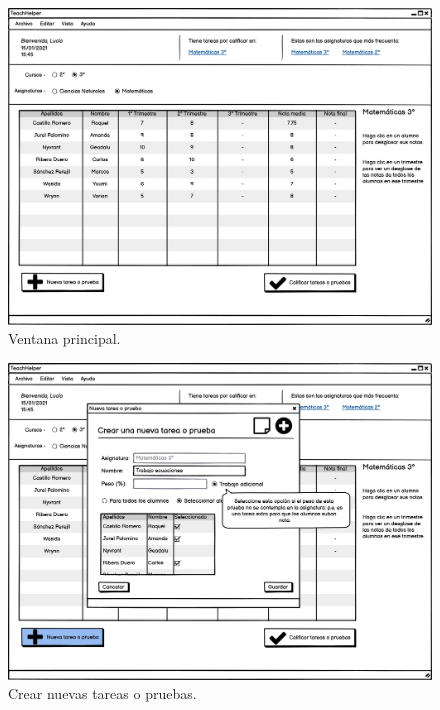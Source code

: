 \begin{figure}[h]
\centering\includegraphics[width=1\linewidth]{figs/mockup_mainwindow.png}
\caption{Ventana principal.}
\label{Fig:mockup_mainwindow}
\end{figure}

\begin{figure}[h]
\centering\includegraphics[width=1\linewidth]{figs/mockup_nuevatarea.png}
\caption{Crear nuevas tareas o pruebas.}
\label{Fig:mockup_nuevatarea}
\end{figure}


